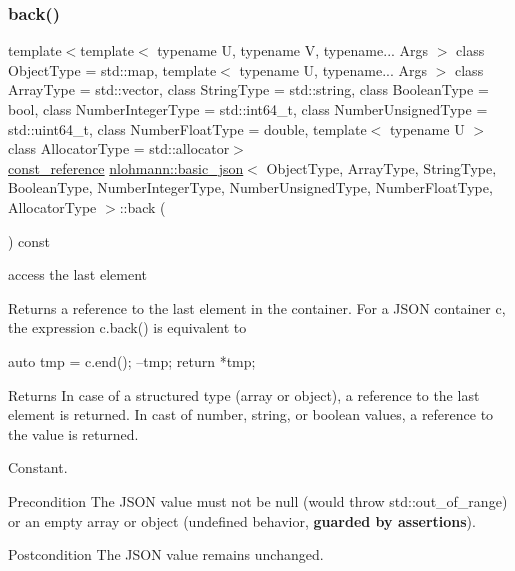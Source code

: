 \subsubsection{\texorpdfstring{back()}{back()}\hspace{0.1cm}{\footnotesize\ttfamily [2/2]}}
{\footnotesize\ttfamily template$<$template$<$ typename U, typename V, typename... Args $>$ class Object\+Type = std\+::map, template$<$ typename U, typename... Args $>$ class Array\+Type = std\+::vector, class String\+Type  = std\+::string, class Boolean\+Type  = bool, class Number\+Integer\+Type  = std\+::int64\+\_\+t, class Number\+Unsigned\+Type  = std\+::uint64\+\_\+t, class Number\+Float\+Type  = double, template$<$ typename U $>$ class Allocator\+Type = std\+::allocator$>$ \\
\hyperlink{classnlohmann_1_1basic__json_af677a29b0e66edc9f66e5167e4667071}{const\+\_\+reference} \hyperlink{classnlohmann_1_1basic__json}{nlohmann\+::basic\+\_\+json}$<$ Object\+Type, Array\+Type, String\+Type, Boolean\+Type, Number\+Integer\+Type, Number\+Unsigned\+Type, Number\+Float\+Type, Allocator\+Type $>$\+::back (\begin{DoxyParamCaption}{ }\end{DoxyParamCaption}) const\hspace{0.3cm}{\ttfamily [inline]}}



access the last element 

Returns a reference to the last element in the container. For a J\+S\+ON container {\ttfamily c}, the expression {\ttfamily c.\+back()} is equivalent to 
\begin{DoxyCode}
\textcolor{keyword}{auto} tmp = c.end();
--tmp;
\textcolor{keywordflow}{return} *tmp;
\end{DoxyCode}


\begin{DoxyReturn}{Returns}
In case of a structured type (array or object), a reference to the last element is returned. In cast of number, string, or boolean values, a reference to the value is returned.
\end{DoxyReturn}
Constant.

\begin{DoxyPrecond}{Precondition}
The J\+S\+ON value must not be {\ttfamily null} (would throw {\ttfamily std\+::out\+\_\+of\+\_\+range}) or an empty array or object (undefined behavior, {\bfseries guarded by assertions}). 
\end{DoxyPrecond}
\begin{DoxyPostcond}{Postcondition}
The J\+S\+ON value remains unchanged.
\end{DoxyPostcond}

